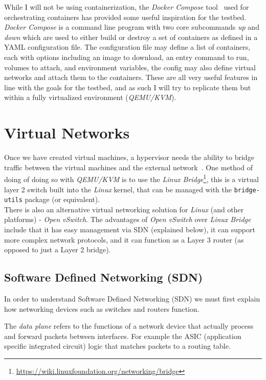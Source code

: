 \documentclass[
    author={Jacob Daniel Halsey},
    supervisor={Prof. Awais Rashid},
    degree={BSc},
    title={Building a Testbed for Evaluating Privacy Enhancing Technologies  (PETs)},
    subtitle={},
    type={software development},
    year={2021}
]{dissertation}
\begin{document}
While I will not be using containerization, the \emph{Docker Compose} tool~\cite{docker_compose}
used for orchestrating containers has provided some useful inspiration for the testbed.
\emph{Docker Compose} is a command line program with two core subcommands \emph{up}
and \emph{down} which are used to either build or destroy a set of containers as defined
in a YAML configuration file. The configuration file may define a list of containers, each 
with options including an image to download, an entry command to run, volumes to attach,
and environment variables, the config may also define virtual networks and attach them
to the containers. These are all very useful features in line with the goals for the testbed, and as such
I will try to replicate them but within a fully virtualized environment (\emph{QEMU/KVM}).

\section{Virtual Networks}

Once we have created virtual machines, a hypervisor needs the ability to bridge traffic between
the virtual machines and the external network~\cite{openvswitch_why}. 
One method of doing of doing so with \emph{QEMU/KVM} is to use the 
\emph{Linux Bridge}\footnote{\url{https://wiki.linuxfoundation.org/networking/bridge}},
this is a virtual layer 2 switch built into the \emph{Linux} kernel, that can be
managed with the \texttt{bridge-utils} package (or equivalent). \\

There is also an alternative virtual networking solution for \emph{Linux} (and other platforms)
- \emph{Open vSwitch}. The advantages of \emph{Open vSwitch} over \emph{Linux Bridge} include that it has
easy management via SDN (explained below), it can support more complex network protocols, and it can
function as a Layer 3 router (as opposed to just a Layer 2 bridge).

\subsection{Software Defined Networking (SDN)}

In order to understand Software Defined Networking (SDN) we must first explain how networking
devices such as switches and routers function. 

The \emph{data plane} refers to the functions of a network device that actually process and forward
packets between interfaces. For example the ASIC (application specific integrated circuit) logic
that matches packets to a routing table.
\end{document}
